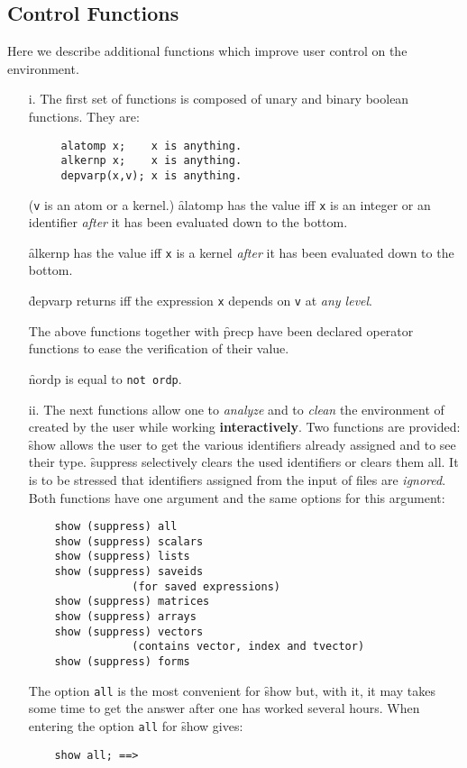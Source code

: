 \subsection{Control Functions}
Here we describe additional functions which
improve user control on the environment.
\begin{itemize}
\item[i.]
\hypertarget{operator:ALATOMP}{}
\hypertarget{operator:ALKERNP}{}
\hypertarget{operator:DEPVARP}{}
The first set of functions is composed of unary and binary boolean functions.
They are:
\begin{verbatim}
     alatomp x;    x is anything.
     alkernp x;    x is anything.
     depvarp(x,v); x is anything.
\end{verbatim}
(\texttt{v} is an atom or a kernel.)
\f{alatomp} has the value  iff \texttt{x} is an integer or  an identifier
\emph{after} it has been evaluated down to the bottom.

\f{alkernp} has the value  iff \texttt{x} is a kernel \emph{after}
it has been evaluated down to the bottom.

\f{depvarp} returns  iff the expression \texttt{x} depends on \texttt{v} at
\emph{any level}.

\hypertarget{operator:PRECP}{}
\hypertarget{operator:NORDP}{}
The above functions together with \f{precp} have
been declared operator functions to ease the verification of
their value.

\f{nordp} is equal to \texttt{not ordp}.
\item[ii.]
The next functions allow one to \emph{analyze} and to
\emph{clean} the environment
of \REDUCE created by the user while working
\textbf{interactively}. Two functions are provided:\\
\hypertarget{operator:SHOW}{}
\hypertarget{operator:SUPPRESS}{}
\f{show} allows the user to get the various identifiers already
assigned and to see their type. \f{suppress} selectively clears the
used identifiers or clears them all. It is to be stressed that identifiers
assigned from the input of files are \emph{ignored}.
Both functions have one argument and the same options for this
argument:
\begin{verbatim}
    show (suppress) all
    show (suppress) scalars
    show (suppress) lists
    show (suppress) saveids
                (for saved expressions)
    show (suppress) matrices
    show (suppress) arrays
    show (suppress) vectors
                (contains vector, index and tvector)
    show (suppress) forms
\end{verbatim}
The option \texttt{all} is the most convenient for \f{show} but,
with it, it may
takes some time to get the answer after one has worked several hours.
When entering \REDUCE the option \texttt{all} for \f{show} gives:
\begin{verbatim}
    show all; ==>


\end{verbatim}
\end{itemize}
